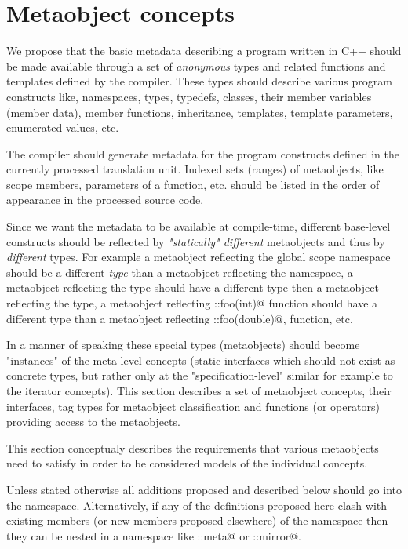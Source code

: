 \section{Metaobject concepts}
\label{section-Concepts}

We propose that the basic metadata describing a program written
in C++ should be made available through a set of {\em anonymous} types
and related functions and templates
defined by the compiler. These types should describe various program
constructs like, namespaces, types, typedefs, classes, their member variables
(member data), member functions, inheritance, templates, template parameters,
enumerated values, etc.

The compiler should generate metadata for the program constructs defined
in the currently processed translation unit. Indexed sets (ranges) of metaobjects,
like scope members, parameters of a function, etc. should be listed
in the order of appearance in the processed source code.

Since we want the metadata to be available at compile-time,
different base-level constructs should be reflected by
{\em "statically" different} metaobjects and thus by {\em different} types.
For example a metaobject reflecting the global scope namespace should
be a different {\em type} than a metaobject reflecting the \verb@std@
namespace, a metaobject reflecting the \verb@int@ type should
have a different type then a metaobject reflecting the \verb@double@
type, a metaobject reflecting \verb@::foo(int)@ function should
have a different type than a metaobject reflecting \verb@::foo(double)@,
function, etc.

In a manner of speaking these special types (metaobjects) should become
"instances" of the meta-level concepts (static interfaces which
should not exist as concrete types, but rather only at the
"specification-level" similar for example to the iterator concepts).
This section describes a set of metaobject concepts,
their interfaces, tag types for metaobject classification and
functions (or operators) providing access to the metaobjects.

This section conceptualy describes the requirements that various metaobjects
need to satisfy in order to be considered models of the individual
concepts.

Unless stated otherwise all additions proposed and described below should
go into the \verb@std@ namespace. Alternatively, if any of the definitions
proposed here clash with existing members (or new members proposed elsewhere)
of the \verb@std@ namespace then they can be nested in a namespace like
\verb@std::meta@ or \verb@std::mirror@.

